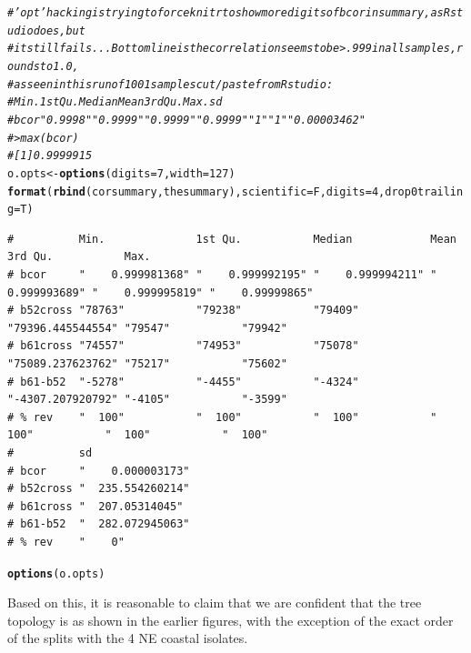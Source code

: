 \documentclass{article}\usepackage[]{graphicx}\usepackage[]{color}
\makeatletter
\newcommand{\hlnum}[1]{\textcolor[rgb]{0.686,0.059,0.569}{#1}}%
\newcommand{\hlcom}[1]{\textcolor[rgb]{0.678,0.584,0.686}{\textit{#1}}}%
\newcommand{\hlstd}[1]{\textcolor[rgb]{0.345,0.345,0.345}{#1}}%
\newcommand{\hlkwb}[1]{\textcolor[rgb]{0.69,0.353,0.396}{#1}}%
\newcommand{\hlkwc}[1]{\textcolor[rgb]{0.333,0.667,0.333}{#1}}%
\newcommand{\hlkwd}[1]{\textcolor[rgb]{0.737,0.353,0.396}{\textbf{#1}}}%
\newenvironment{kframe}{%
 \def\at@end@of@kframe{}%
 \ifinner\ifhmode%
  \def\at@end@of@kframe{\end{minipage}}%
  \begin{minipage}{\columnwidth}%
 \fi\fi%
 \def\FrameCommand##1{\hskip\@totalleftmargin \hskip-\fboxsep
 \colorbox{shadecolor}{##1}\hskip-\fboxsep
     \hskip-\linewidth \hskip-\@totalleftmargin \hskip\columnwidth}%
 \MakeFramed {\advance\hsize-\width
   \@totalleftmargin\z@ \linewidth\hsize
   \@setminipage}}%
 {\par\unskip\endMakeFramed%
 \at@end@of@kframe}
\newenvironment{knitrout}{}{} %
\makeatother
\begin{document}
\begin{knitrout}\footnotesize
{}\color{fgcolor}\begin{kframe}
\begin{alltt}
\hlcom{# 'opt' hacking is trying to force knitr to show more digits of bcor in summary, as Rstudio does, but}
\hlcom{# it still fails...  Bottom line is the correlation seems to be  > .999 in all samples, rounds to 1.0,}
\hlcom{# as seen in this run of 1001 samples cut/paste from Rstudio:}
\hlcom{#          Min.        1st Qu.     Median      Mean        3rd Qu. Max.   sd             }
\hlcom{# bcor     "   0.9998" "   0.9999" "   0.9999" "   0.9999" "   1"  "   1" "   0.00003462"}
\hlcom{# > max(bcor)}
\hlcom{# [1] 0.9999915}
\hlstd{o.opts} \hlkwb{<-} \hlkwd{options}\hlstd{(}\hlkwc{digits}\hlstd{=}\hlnum{7}\hlstd{,}\hlkwc{width}\hlstd{=}\hlnum{127}\hlstd{)}
\hlkwd{format}\hlstd{(}\hlkwd{rbind}\hlstd{(corsummary,thesummary),}\hlkwc{scientific}\hlstd{=F,}\hlkwc{digits}\hlstd{=}\hlnum{4}\hlstd{,}\hlkwc{drop0trailing}\hlstd{=T)}
\end{alltt}
\begin{verbatim}
#          Min.              1st Qu.           Median            Mean              3rd Qu.           Max.            
# bcor     "    0.999981368" "    0.999992195" "    0.999994211" "    0.999993689" "    0.999995819" "    0.99999865"
# b52cross "78763"           "79238"           "79409"           "79396.445544554" "79547"           "79942"         
# b61cross "74557"           "74953"           "75078"           "75089.237623762" "75217"           "75602"         
# b61-b52  "-5278"           "-4455"           "-4324"           "-4307.207920792" "-4105"           "-3599"         
# % rev    "  100"           "  100"           "  100"           "  100"           "  100"           "  100"         
#          sd               
# bcor     "    0.000003173"
# b52cross "  235.554260214"
# b61cross "  207.05314045" 
# b61-b52  "  282.072945063"
# % rev    "    0"
\end{verbatim}
\begin{alltt}
\hlkwd{options}\hlstd{(o.opts)}
\end{alltt}
\end{kframe}
\end{knitrout}

Based on this, it is reasonable to claim that we are confident that the tree topology is as shown in the earlier
figures, with the exception of the exact order of the splits with the 4 NE coastal isolates.
\end{document}
